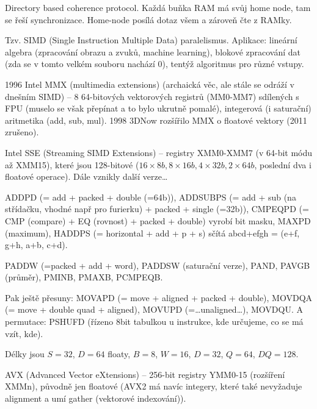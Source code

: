 \documentclass[12pt]{article}                   %
\begin{document}
        \begin{definice}[HT-Assist]
            Directory based coherence protocol. Každá buňka RAM má svůj home node, tam se řeší synchronizace. Home-node posílá dotaz všem a zároveň čte z RAMky.
        \end{definice}


        \begin{definice}
            Tzv. SIMD (Single Instruction Multiple Data) paralelismus. Aplikace: lineární algebra (zpracování obrazu a zvuků, machine learning), blokové zpracování dat (zda se v tomto velkém souboru nachází 0), tentýž algoritmus pro různé vstupy.

            1996 Intel MMX (multimedia extensions) (archaická věc, ale stále se odráží v dnešním SIMD) -- 8 64-bitových vektorových registrů (MM0-MM7) sdílených s FPU (muselo se však přepínat a to bylo ukrutně pomalé), integerová (i saturační) aritmetika (add, sub, mul). 1998 3DNow rozšířilo MMX o floatové vektory (2011 zrušeno).

            Intel SSE (Streaming SIMD Extensions) -- registry XMM0-XMM7 (v 64-bit módu až XMM15), které jsou 128-bitové ($16\times 8b, 8 \times 16b, 4 \times 32b, 2 \times 64b$, poslední dva i floatové operace). Dále vznikly další verze…

            ADDPD (= add + packed + double (=64b)), ADDSUBPS (= add + sub (na střídačku, vhodné např pro furierku) + packed + single (=32b)), CMPEQPD (= CMP (compare) + EQ (rovnost) + packed + double) vyrobí bit masku, MAXPD (maximum), HADDPS (= horizontal + add + p + s) sčítá abcd+efgh = (e+f, g+h, a+b, c+d).

            PADDW (=packed + add + word), PADDSW (saturační verze), PAND, PAVGB (průměr), PMINB, PMAXB, PCMPEQB.

            Pak ještě přesuny: MOVAPD (= move + aligned + packed + double), MOVDQA (= move + double quad + aligned), MOVUPD (=…unaligned…), MOVDQU. A permutace: PSHUFD (řízeno 8bit tabulkou u instrukce, kde určujeme, co se má vzít, kde).

            Délky jsou $S=32$, $D=64$ floaty, $B=8$, $W=16$, $D=32$, $Q=64$, $DQ=128$.

            AVX (Advanced Vector eXtensions) -- 256-bit registry YMM0-15 (rozšíření XMMn), původně jen floatové (AVX2 má navíc integery, které také nevyžaduje alignment a umí gather (vektorové indexování)).
        \end{definice}
\end{document}
